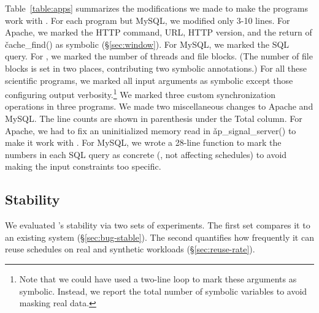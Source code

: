 Table~\ref{table:apps} summarizes the modifications we made to make the
programs work with \tern.  For each program but MySQL, we modified only 3-10
lines.  For Apache, we marked the HTTP command, URL, HTTP version, and the
return of \v{cache\_find()} as symbolic (\S\ref{sec:window}).  For MySQL,
we marked the SQL query.  For \pbzip, we marked the number of threads and
file blocks.  (The number of file blocks is set in two places,
contributing two symbolic annotations.)  For all these scientific programs, we
marked all input arguments as symbolic except those configuring output
verbosity.\footnote{Note that we could have used a two-line loop to mark
  these arguments as symbolic.  Instead, we report the total number of
  symbolic variables to avoid masking real data.}  We marked three custom
synchronization operations in three \splash programs.  We made two
miscellaneous changes to Apache and MySQL.  The line counts are shown in
parenthesis under the Total column.  For Apache, we had to fix an
uninitialized memory read in \v{ap\_signal\_server()} to make it work with
\klee.  For MySQL, we wrote a 28-line function to mark the numbers in each
SQL query as concrete (\ie, not affecting schedules) to avoid making the
input constraints too specific.



\subsection{Stability} \label{sec:stability}

We evaluated \tern's stability via two sets of experiments.  The first set
compares it to an existing \dmt system (\S\ref{sec:bug-stable}). The
second quantifies how frequently it can reuse schedules on real and
synthetic workloads (\S\ref{sec:reuse-rate}).

